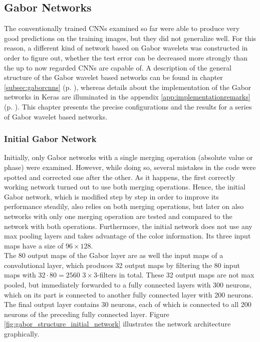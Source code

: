 \documentclass[11pt, a4paper]{article}
\newcommand\myref[1]{\ref{#1} (p. \pageref{#1})}
\begin{document}


\newpage
\subsection{Gabor Networks}
\label{subsec:results_gabornetworks}

The conventionally trained \acp{CNN} examined so far were able to produce very good predictions on the training images, but they did not generalize well. For this reason, a different kind of network based on Gabor wavelets was constructed in order to figure out, whether the test error can be decreased more strongly than the up to now regarded \acp{CNN} are capable of. A description of the general structure of the Gabor wavelet based networks can be found in chapter \myref{subsec:gaborcnns}, whereas details about the implementation of the Gabor networks in Keras are illuminated in the appendix \myref{app:implementationremarks}. This chapter presents the precise configurations and the results for a series of Gabor wavelet based networks.

\subsubsection{Initial Gabor Network}

Initially, only Gabor networks with a single merging operation (absolute value or phase) were examined. However, while doing so, several mistakes in the code were spotted and corrected one after the other. As it happens, the first correctly working network turned out to use both merging operations. Hence, the initial Gabor network, which is modified step by step in order to improve its performance steadily, also relies on both merging operations, but later on also networks with only one merging operation are tested and compared to the network with both operations. Furthermore, the initial network does not use any max pooling layers and takes advantage of the color information. Its three input maps have a size of $96\times128$.\\
The 80 output maps of the Gabor layer are as well the input maps of a convolutional layer, which produces 32 output maps by filtering the 80 input maps with $32\cdot80 = 2560$ $3\times3$-filters in total. These 32 output maps are not max pooled, but immediately forwarded to a fully connected layers with 300 neurons, which on its part is connected to another fully connected layer with 200 neurons. The final output layer contains 30 neurons, each of which is connected to all 200 neurons of the preceding fully connected layer. Figure \ref{fig:gabor_structure_initial_network} illustrates the network architecture graphically.
\end{document}
